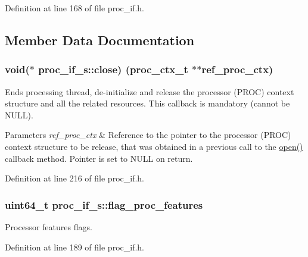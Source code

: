 Definition at line 168 of file proc\+\_\+if.\+h.



\subsection{Member Data Documentation}
\subsubsection[{\texorpdfstring{close}{close}}]{\setlength{\rightskip}{0pt plus 5cm}void($\ast$ proc\+\_\+if\+\_\+s\+::close) ({\bf proc\+\_\+ctx\+\_\+t} $\ast$$\ast$ref\+\_\+proc\+\_\+ctx)}\hypertarget{structproc__if__s_af5971ac1d09d1c6ec3508c36fb286c19}{}\label{structproc__if__s_af5971ac1d09d1c6ec3508c36fb286c19}
Ends processing thread, de-\/initialize and release the processor (P\+R\+OC) context structure and all the related resources. This callback is mandatory (cannot be N\+U\+LL). 
\begin{DoxyParams}{Parameters}
{\em ref\+\_\+proc\+\_\+ctx} & Reference to the pointer to the processor (P\+R\+OC) context structure to be release, that was obtained in a previous call to the \textquotesingle{}\hyperlink{structproc__if__s_a34999576771394dfb721463c8455ba06}{open()}\textquotesingle{} callback method. Pointer is set to N\+U\+LL on return. \\
\hline
\end{DoxyParams}


Definition at line 216 of file proc\+\_\+if.\+h.

\subsubsection[{\texorpdfstring{flag\+\_\+proc\+\_\+features}{flag_proc_features}}]{\setlength{\rightskip}{0pt plus 5cm}uint64\+\_\+t proc\+\_\+if\+\_\+s\+::flag\+\_\+proc\+\_\+features}\hypertarget{structproc__if__s_a657d976a32c34bff11070599b11c2dd7}{}\label{structproc__if__s_a657d976a32c34bff11070599b11c2dd7}
Processor features flags. 

Definition at line 189 of file proc\+\_\+if.\+h.

